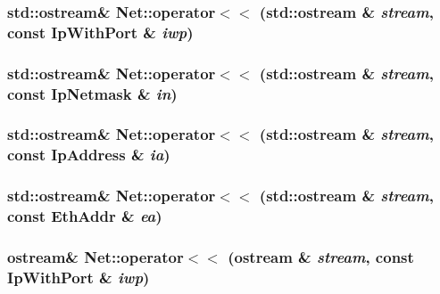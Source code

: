 \label{namespaceNet_a7e50a230aeed27f50f5dd05a5768c74c}
\hypertarget{namespaceNet_a767c129a825fcade7c84662752bc7696}{
\subsubsection[{operator$<$$<$}]{\setlength{\rightskip}{0pt plus 5cm}std::ostream\& Net::operator$<$$<$ (std::ostream \& {\em stream}, \/  const IpWithPort \& {\em iwp})}}
\label{namespaceNet_a767c129a825fcade7c84662752bc7696}
\hypertarget{namespaceNet_a74553ce1b89582d6984b297ff67e1e20}{
\subsubsection[{operator$<$$<$}]{\setlength{\rightskip}{0pt plus 5cm}std::ostream\& Net::operator$<$$<$ (std::ostream \& {\em stream}, \/  const IpNetmask \& {\em in})}}
\label{namespaceNet_a74553ce1b89582d6984b297ff67e1e20}
\hypertarget{namespaceNet_a2949e3b1ccefd2ea4bf18bdbac77a27d}{
\subsubsection[{operator$<$$<$}]{\setlength{\rightskip}{0pt plus 5cm}std::ostream\& Net::operator$<$$<$ (std::ostream \& {\em stream}, \/  const IpAddress \& {\em ia})}}
\label{namespaceNet_a2949e3b1ccefd2ea4bf18bdbac77a27d}
\hypertarget{namespaceNet_a33cc7c79cf286230e0e24e91f5e9538d}{
\subsubsection[{operator$<$$<$}]{\setlength{\rightskip}{0pt plus 5cm}std::ostream\& Net::operator$<$$<$ (std::ostream \& {\em stream}, \/  const EthAddr \& {\em ea})}}
\label{namespaceNet_a33cc7c79cf286230e0e24e91f5e9538d}
\hypertarget{namespaceNet_a0e836533fd8b6ae417355a2122f2f48c}{
\subsubsection[{operator$<$$<$}]{\setlength{\rightskip}{0pt plus 5cm}ostream\& Net::operator$<$$<$ (ostream \& {\em stream}, \/  const IpWithPort \& {\em iwp})}}
\label{namespaceNet_a0e836533fd8b6ae417355a2122f2f48c}



